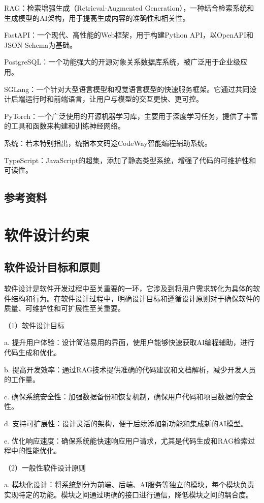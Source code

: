 \documentclass[
    report,     %
    oneside,    %
    UTF8,       %
    zihao=-4    %
]{config} %
\begin{document}
RAG：检索增强生成（Retrieval-Augmented Generation），一种结合检索系统和生成模型的AI架构，用于提高生成内容的准确性和相关性。

FastAPI：一个现代、高性能的Web框架，用于构建Python API，以OpenAPI和JSON Schema为基础。

PostgreSQL：一个功能强大的开源对象关系数据库系统，被广泛用于企业级应用。

SGLang：一个针对大型语言模型和视觉语言模型的快速服务框架。它通过共同设计后端运行时和前端语言，让用户与模型的交互更快、更可控。

PyTorch：一个广泛使用的开源机器学习库，主要用于深度学习任务，提供了丰富的工具和函数来构建和训练神经网络。

系统：若未特别指出，统指本文码途CodeWay智能编程辅助系统。

TypeScript：JavaScript的超集，添加了静态类型系统，增强了代码的可维护性和可读性。
\subsection{参考资料}

\section{软件设计约束}
\subsection{软件设计目标和原则}
软件设计是软件开发过程中至关重要的一环，它涉及到将用户需求转化为具体的软件结构和行为。在软件设计过程中，明确设计目标和遵循设计原则对于确保软件的质量、可维护性和可扩展性至关重要。

（1）软件设计目标

a. 提升用户体验：设计简洁易用的界面，使用户能够快速获取AI编程辅助，进行代码生成和优化。

b. 提高开发效率：通过RAG技术提供准确的代码建议和文档解析，减少开发人员的工作量。

c. 确保系统安全性：加强数据备份和恢复机制，确保用户代码和项目数据的安全性。

d. 支持可扩展性：设计灵活的架构，便于后续添加新功能和集成新的AI模型。

e. 优化响应速度：确保系统能快速响应用户请求，尤其是代码生成和RAG检索过程中的性能优化。

（2）一般性软件设计原则

a. 模块化设计：将系统划分为前端、后端、AI服务等独立的模块，每个模块负责实现特定的功能。模块之间通过明确的接口进行通信，降低模块之间的耦合度。
\end{document}
